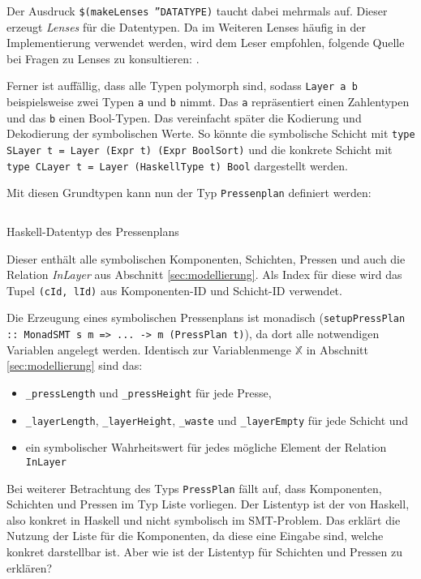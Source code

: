 Der Ausdruck \texttt{\$(makeLenses ''DATATYPE)} taucht dabei mehrmals auf.
Dieser erzeugt \textit{Lenses} für die Datentypen.
Da im Weiteren Lenses häufig in der Implementierung verwendet werden, wird dem Leser empfohlen, folgende Quelle bei Fragen zu Lenses zu konsultieren: \cite{lenses}.

Ferner ist auffällig, dass alle Typen polymorph sind, sodass \texttt{Layer a b} beispielsweise zwei Typen \texttt{a} und \texttt{b} nimmt.
Das \texttt{a} repräsentiert einen Zahlentypen und das \texttt{b} einen Bool-Typen.
Das vereinfacht später die Kodierung und Dekodierung der symbolischen Werte.
So könnte die symbolische Schicht mit \texttt{type SLayer t = Layer (Expr t) (Expr BoolSort)}
und die konkrete Schicht mit \texttt{type CLayer t = Layer (HaskellType t) Bool} dargestellt werden.

Mit diesen Grundtypen kann nun der Typ \texttt{Pressenplan} definiert werden:

\begin{listing}[H]
    \inputminted[linenos=true]{haskell}{Code/Implementierung/Datatypes2.hs}
    \caption{Haskell-Datentyp des Pressenplans}
    \label{listing:datatypes2}
\end{listing}

Dieser enthält alle symbolischen Komponenten, Schichten, Pressen und auch die Relation \textit{InLayer} aus Abschnitt \ref{sec:modellierung}.
Als Index für diese wird das Tupel \texttt{(cId, lId)} aus Komponenten-ID und Schicht-ID verwendet.

Die Erzeugung eines symbolischen Pressenplans ist monadisch (\texttt{setupPressPlan :: MonadSMT s m => ... -> m (PressPlan t)}), da dort alle notwendigen Variablen angelegt werden.
Identisch zur Variablenmenge $\mathbb{X}$ in Abschnitt \ref{sec:modellierung} sind das:

\begin{itemize}
    \item \texttt{\_pressLength} und \texttt{\_pressHeight} für jede Presse,
    \item \texttt{\_layerLength}, \texttt{\_layerHeight}, \texttt{\_waste} und \texttt{\_layerEmpty} für jede Schicht und
    \item ein symbolischer Wahrheitswert für jedes mögliche Element der Relation \texttt{InLayer}
\end{itemize}

Bei weiterer Betrachtung des Typs \texttt{PressPlan} fällt auf, dass Komponenten, Schichten und Pressen im Typ Liste vorliegen.
Der Listentyp ist der von Haskell, also konkret in Haskell und nicht symbolisch im SMT-Problem.
Das erklärt die Nutzung der Liste für die Komponenten, da diese eine Eingabe sind, welche konkret darstellbar ist.
Aber wie ist der Listentyp für Schichten und Pressen zu erklären?

